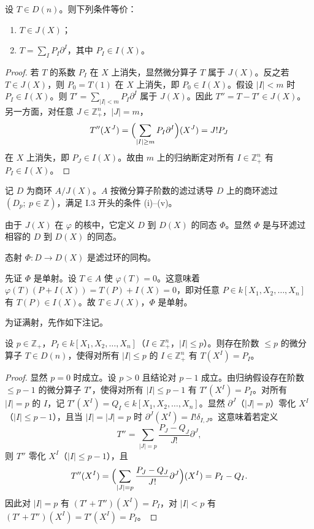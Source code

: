 \begin{lemma}
设 $T\in D(n)$。则下列条件等价：
\begin{enumerate}[label=(\roman*)]
  \item $T\in J(X)$；
  \item $T=\sum_I P_I\partial^I$，其中 $P_I\in I(X)$。
\end{enumerate}
\end{lemma}

\begin{proof}
若 $T$ 的系数 $P_I$ 在 $X$ 上消失，显然微分算子 $T$ 属于 $J(X)$。反之若 $T\in J(X)$，则 $P_0=T(1)$ 在 $X$ 上消失，即 $P_0\in I(X)$。假设 $|I|<m$ 时 $P_I\in I(X)$。则 $T'=\sum_{|I|<m}P_I\partial^I$ 属于 $J(X)$。因此 $T''=T-T'\in J(X)$。另一方面，对任意 $J\in\mathbb{Z}_+^n$，$|J|=m$，
$$T''(X^J)=\Bigl(\sum_{|I|\ge m}P_I\partial^I\Bigr)(X^J)=J!P_J$$
在 $X$ 上消失，即 $P_J\in I(X)$。故由 $m$ 上的归纳断定对所有 $I\in\mathbb{Z}_+^n$ 有 $P_I\in I(X)$。
\end{proof}

记 $D$ 为商环 $A/J(X)$。$A$ 按微分算子阶数的滤过诱导 $D$ 上的商环滤过 $(D_p;\ p\in\mathbb{Z})$，满足 I.3 开头的条件 (i)--(v)。

由于 $J(X)$ 在 $\varphi$ 的核中，它定义 $D$ 到 $D(X)$ 的同态 $\Phi$。显然 $\Phi$ 是与环滤过相容的 $D$ 到 $D(X)$ 的同态。

\begin{proposition}
态射 $\Phi:D\to D(X)$ 是滤过环的同构。
\end{proposition}

先证 $\Phi$ 是单射。设 $T\in A$ 使 $\varphi(T)=0$。这意味着 $\varphi(T)(P+I(X))=T(P)+I(X)=0$，即对任意 $P\in k[X_1,X_2,\dots,X_n]$ 有 $T(P)\in I(X)$。故 $T\in J(X)$，$\Phi$ 是单射。

为证满射，先作如下注记。

\begin{lemma}
设 $p\in\mathbb{Z}_+$，$P_I\in k[X_1,X_2,\dots,X_n]$（$I\in\mathbb{Z}_+^n$，$|I|\le p$）。则存在阶数 $\le p$ 的微分算子 $T\in D(n)$，使得对所有 $|I|\le p$ 的 $I\in\mathbb{Z}_+^n$ 有 $T(X^I)=P_I$。
\end{lemma}

\begin{proof}
显然 $p=0$ 时成立。设 $p>0$ 且结论对 $p-1$ 成立。由归纳假设存在阶数 $\le p-1$ 的微分算子 $T'$，使得对所有 $|I|\le p-1$ 有 $T'(X^I)=P_I$。对所有 $|I|=p$ 的 $I$，记 $T'(X^I)=Q_I\in k[X_1,X_2,\dots,X_n]$。显然 $\partial^J$（$|J|=p$）零化 $X^I$（$|I|\le p-1$），且当 $|I|=|J|=p$ 时 $\partial^J(X^I)=I!\delta_{I,J}$。这意味着若定义
$$T''=\sum_{|J|=p}\frac{P_J-Q_J}{J!}\partial^J,$$
则 $T''$ 零化 $X^I$（$|I|\le p-1$），且
$$T''(X^I)=\Bigl(\sum_{|J|=p}\frac{P_J-Q_J}{J!}\partial^J\Bigr)(X^I)=P_I-Q_I.$$
因此对 $|I|=p$ 有 $(T'+T'')(X^I)=P_I$，对 $|I|<p$ 有 $(T'+T'')(X^I)=T'(X^I)=P_I$。
\end{proof}

